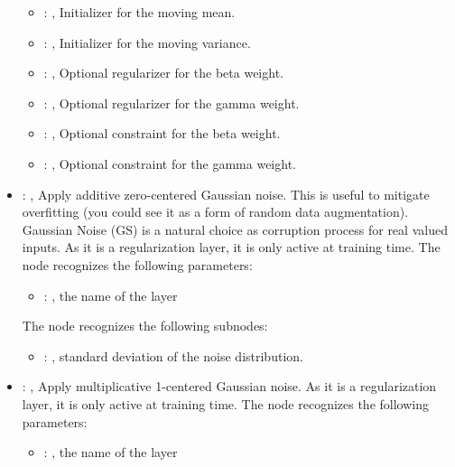 \begin{itemize}
\begin{itemize}
        \item {}: , 
          Initializer for the moving mean.

        \item {}: , 
          Initializer for the moving variance.

        \item {}: , 
          Optional regularizer for the beta weight.

        \item {}: , 
          Optional regularizer for the gamma weight.

        \item {}: , 
          Optional constraint for the beta weight.

        \item {}: , 
          Optional constraint for the gamma weight.
      \end{itemize}

    \item {}: , 
      Apply additive zero-centered Gaussian noise. This is useful to mitigate overfitting (you could
      see         it as a form of random data augmentation). Gaussian Noise (GS) is a natural choice
      as corruption process         for real valued inputs. As it is a regularization layer, it is
      only active at training time.
      The  node recognizes the following parameters:
        \begin{itemize}
          \item {}: , 
            the name of the layer
      \end{itemize}

      The  node recognizes the following subnodes:
      \begin{itemize}
        \item {}: , 
          standard deviation of the noise distribution.
      \end{itemize}

    \item {}: , 
      Apply multiplicative 1-centered Gaussian noise. As it is a regularization layer, it is only
      active         at training time.
      The  node recognizes the following parameters:
        \begin{itemize}
          \item {}: , 
            the name of the layer
      \end{itemize}


\end{itemize}
